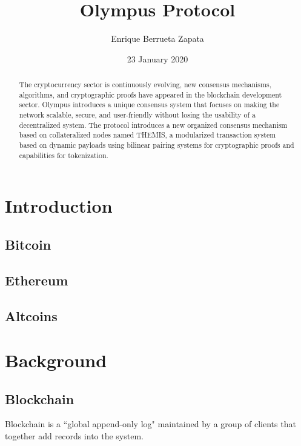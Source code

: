 \documentclass{article}
\title{Olympus Protocol}
\author{Enrique Berrueta Zapata}
\date{23 January 2020}
\begin{document}
	\maketitle
	\begin{abstract}
		The cryptocurrency sector is continuously evolving, new consensus mechanisms, algorithms, and cryptographic proofs have appeared in the blockchain development sector. Olympus introduces a unique consensus system that focuses on making the network scalable, secure, and user-friendly without losing the usability of a decentralized system. The protocol introduces a new organized consensus mechanism based on collateralized nodes named THEMIS, a modularized transaction system based on dynamic payloads using bilinear pairing systems for cryptographic proofs and capabilities for tokenization.
	\end{abstract}
	
	\newpage
	\tableofcontents
	\newpage
	
	\newpage
	
	\section{Introduction}

	\subsection{Bitcoin}
	
	\subsection{Ethereum}
	
	\subsection{Altcoins}
	
	\section{Background}

	\subsection{Blockchain}
	
	Blockchain is a ``global append-only log" \cite[p.4]{bitcoin-mining-is-vulnerable} maintained by a group of clients that together add records into the system.
	
\end{document}
